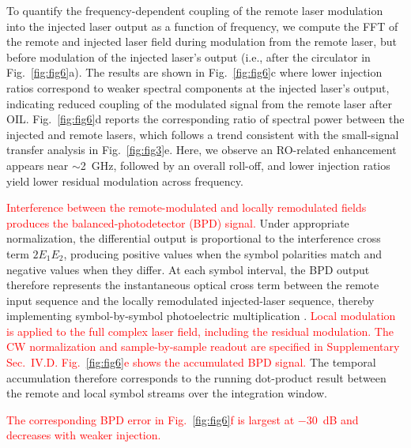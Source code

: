 \documentclass[%
 aip,
 apl,
 amsmath,amssymb,
 reprint,%
 floatfix,
]{revtex4-1}
\newcommand{\reviewreplace}[2]{\textcolor{red}{#2}}
\begin{document}
To quantify the frequency-dependent coupling of the remote laser modulation into the injected laser output as a function of frequency, we compute the FFT of the remote and injected laser field during modulation from the remote laser, but before modulation of the injected laser's output (i.e., after the circulator in Fig.~\ref{fig:fig6}a). The results are shown in Fig.~\ref{fig:fig6}c where lower injection ratios correspond to weaker spectral components at the injected laser's output, indicating reduced coupling of the modulated signal from the remote laser after OIL.
Fig.~\ref{fig:fig6}d reports the corresponding ratio of spectral power between the injected and remote lasers, which follows a trend consistent with the small-signal transfer analysis in Fig.~\ref{fig:fig3}e. Here, we observe an RO-related enhancement appears near $\sim$2~GHz, followed by an overall roll-off, and lower injection ratios yield lower residual modulation across frequency.

\reviewreplace{Fig.~\ref{fig:fig6}e shows the modeled balanced-photodetector (BPD) differential output obtained by interfering the remote-modulated signal and the locally modulated injected laser signal.}{Interference between the remote-modulated and locally remodulated fields produces the balanced-photodetector (BPD) signal.}
Under appropriate normalization, the differential output is proportional to the interference cross term $2E_1E_2$, producing positive values when the symbol polarities match and negative values when they differ. At each symbol interval, the BPD output therefore represents the instantaneous optical cross term between the remote input sequence and the locally remodulated injected-laser sequence, thereby implementing symbol-by-symbol photoelectric multiplication \cite{Hamerly2019PRX_PhotoelectricMultiplication}.
\textcolor{red}{Local modulation is applied to the full complex laser field, including the residual modulation. The CW normalization and sample-by-sample readout are specified in Supplementary Sec.~IV.D.}
\reviewreplace{Fig.~\ref{fig:fig6}f plots the modeled temporal accumulation (integration) of the BPD differential signal.}{Fig.~\ref{fig:fig6}e shows the accumulated BPD signal.} The temporal accumulation therefore corresponds to the running dot-product result between the remote and local symbol streams over the integration window.
\textcolor{red}{}

\textcolor{red}{The corresponding BPD error in Fig.~\ref{fig:fig6}f is largest at $-30$~dB and decreases with weaker injection.}
\end{document}

